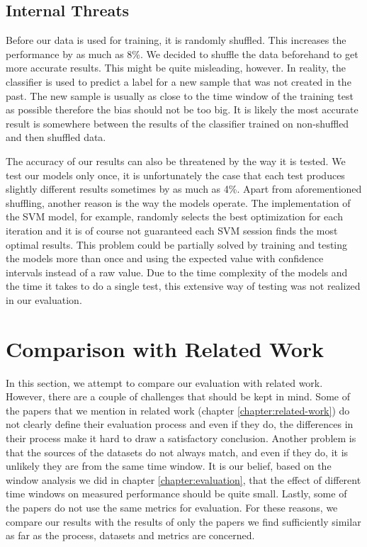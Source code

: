 \subsection{Internal Threats}

Before our data is used for training, it is randomly shuffled. This increases the performance by as much as 8\%. We decided to shuffle the data beforehand to get more accurate results. This might be quite misleading, however. In reality, the classifier is used to predict a label for a new sample that was not created in the past. The new sample is usually as close to the time window of the training test as possible therefore the bias should not be too big. It is likely the most accurate result is somewhere between the results of the classifier trained on non-shuffled and then shuffled data.

The accuracy of our results can also be threatened by the way it is tested. We test our models only once, it is unfortunately the case that each test produces slightly different results sometimes by as much as 4\%. Apart from aforementioned shuffling, another reason is the way the models operate. The implementation of the SVM model, for example, randomly selects the best optimization for each iteration and it is of course not guaranteed each SVM session finds the most optimal results. This problem could be partially solved by training and testing the models more than once and using the expected value with confidence intervals instead of a raw value. Due to the time complexity of the models and the time it takes to do a single test, this extensive way of testing was not realized in our evaluation.

\section{Comparison with Related Work}

In this section, we attempt to compare our evaluation with related work. However, there are a couple of challenges that should be kept in mind. Some of the papers that we mention in related work (chapter \ref{chapter:related-work}) do not clearly define their evaluation process and even if they do, the differences in their process make it hard to draw a satisfactory conclusion. Another problem is that the sources of the datasets do not always match, and even if they do, it is unlikely they are from the same time window. It is our belief, based on the window analysis we did in chapter \ref{chapter:evaluation}, that the effect of different time windows on measured performance should be quite small. Lastly, some of the papers do not use the same metrics for evaluation. For these reasons, we compare our results with the results of only the papers we find sufficiently similar as far as the process, datasets and metrics are concerned.

